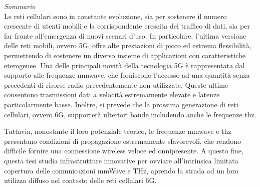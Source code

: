 {\noindent\huge\itshape Sommario}\\
%

Le reti cellulari sono in constante evoluzione, sia per sostenere il numero crescente di utenti mobili e la corrispondente crescita del traffico di dati, sia per far fronte all'emergenza di nuovi scenari d'uso.
In particolare, l'ultima versione delle reti mobili, ovvero 5G, offre alte prestazioni di picco ed estrema flessibilità, permettendo di sostenere un diverso insieme di applicazioni con caratteristiche eterogenee.
Una delle principali novità della tecnologia 5G è rappresentata dal supporto alle frequenze \gls{mmwave}, che forniscono l'accesso ad una quantità senza precedenti di risorse radio precedentemente non utilizzate. Queste ultime consentono trasmissioni dati a velocità estremamente elevate e latenze particolarmente basse. 
Inoltre, si prevede che la prossima generazione di reti cellulari, ovvero 6G, supporterà ulteriori bande includendo anche le frequenze \gls{thz}.

Tuttavia, nonostante il loro potenziale teorico, le frequenze \gls{mmwave} e \gls{thz} presentano condizioni di propagazione estremamente sfavorevoli, che rendono difficile fornire una connessione wireless veloce ed onnipresente. 
A questo fine, questa tesi studia infrastrutture innovative per ovviare all'intrinsica limitata copertura delle comunicazioni mmWave e THz, aprendo la strada ad un loro utilizzo diffuso nel contesto delle reti cellulari 6G.

